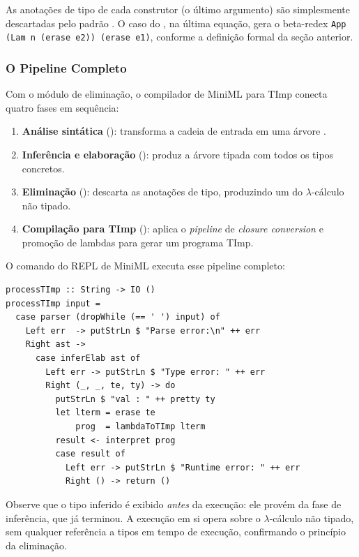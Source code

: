  As anotações de tipo de cada construtor (o último argumento) são
  simplesmente descartadas pelo padrão \haskell{_}. O caso do
  , na última equação, gera o beta-redex
  \texttt{App (Lam n (erase e2)) (erase e1)}, conforme a definição
  formal da seção anterior.

  \subsubsection{O Pipeline Completo}

  Com o módulo de eliminação, o compilador de MiniML para TImp conecta
  quatro fases em sequência:

  \begin{enumerate}
    \item \textbf{Análise sintática} (): transforma a
      cadeia de entrada em uma árvore .
    \item \textbf{Inferência e elaboração} (): produz
      a árvore tipada  com todos os tipos concretos.
    \item \textbf{Eliminação} (): descarta as anotações
      de tipo, produzindo um  do $\lambda$-cálculo não tipado.
    \item \textbf{Compilação para TImp} (): aplica
      o \emph{pipeline} de \emph{closure conversion} e promoção de
      lambdas para gerar um programa TImp.
  \end{enumerate}

  O comando  do REPL de MiniML executa esse pipeline
  completo:

\begin{verbatim}
processTImp :: String -> IO ()
processTImp input =
  case parser (dropWhile (== ' ') input) of
    Left err  -> putStrLn $ "Parse error:\n" ++ err
    Right ast ->
      case inferElab ast of
        Left err -> putStrLn $ "Type error: " ++ err
        Right (_, _, te, ty) -> do
          putStrLn $ "val : " ++ pretty ty
          let lterm = erase te
              prog  = lambdaToTImp lterm
          result <- interpret prog
          case result of
            Left err -> putStrLn $ "Runtime error: " ++ err
            Right () -> return ()
\end{verbatim}

  Observe que o tipo inferido é exibido \emph{antes} da execução: ele
  provém da fase de inferência, que já terminou. A execução em si opera
  sobre o $\lambda$-cálculo não tipado, sem qualquer referência a tipos em
  tempo de execução, confirmando o princípio da eliminação.

